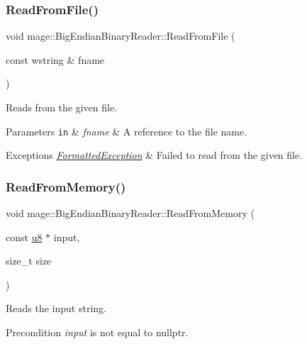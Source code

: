 \subsubsection{\texorpdfstring{Read\+From\+File()}{ReadFromFile()}}
{\footnotesize\ttfamily void mage\+::\+Big\+Endian\+Binary\+Reader\+::\+Read\+From\+File (\begin{DoxyParamCaption}\item[{const wstring \&}]{fname }\end{DoxyParamCaption})}

Reads from the given file.


\begin{DoxyParams}[1]{Parameters}
\mbox{\tt in}  & {\em fname} & A reference to the file name. \\
\hline
\end{DoxyParams}

\begin{DoxyExceptions}{Exceptions}
{\em \hyperlink{structmage_1_1_formatted_exception}{Formatted\+Exception}} & Failed to read from the given file. \\
\hline
\end{DoxyExceptions}
\hypertarget{classmage_1_1_big_endian_binary_reader_aa34a9de3b9d98f0abe423e488f97d5b4}{}\label{classmage_1_1_big_endian_binary_reader_aa34a9de3b9d98f0abe423e488f97d5b4} 
\subsubsection{\texorpdfstring{Read\+From\+Memory()}{ReadFromMemory()}}
{\footnotesize\ttfamily void mage\+::\+Big\+Endian\+Binary\+Reader\+::\+Read\+From\+Memory (\begin{DoxyParamCaption}\item[{const \hyperlink{namespacemage_a5a362e2d56fc439362a80516ecae7828}{u8} $\ast$}]{input,  }\item[{size\+\_\+t}]{size }\end{DoxyParamCaption})}

Reads the input string.

\begin{DoxyPrecond}{Precondition}
{\itshape input} is not equal to {\ttfamily nullptr}. 
\end{DoxyPrecond}

